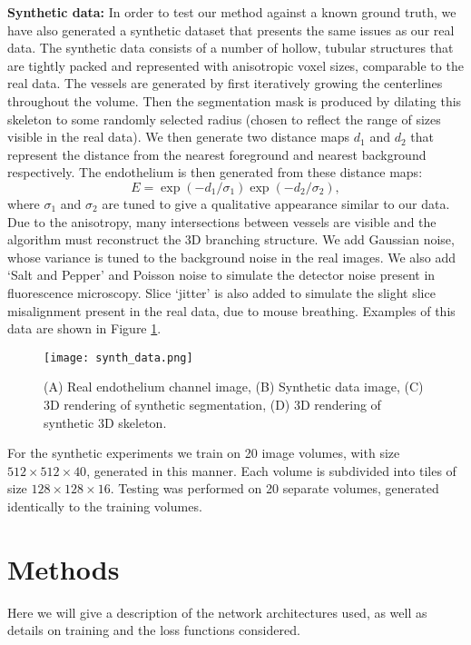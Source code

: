 \documentclass[journal,transmag]{IEEEtran}
\begin{document}
\textbf{Synthetic data:} In order to test our method against a known ground truth, we have also generated a synthetic dataset that presents the same issues as our real data. The synthetic data consists of a number of hollow, tubular structures that are tightly packed and represented with anisotropic voxel sizes, comparable to the real data. The vessels are generated by first iteratively growing the centerlines throughout the volume. Then the segmentation mask is produced by dilating this skeleton to some randomly selected radius (chosen to reflect the range of sizes visible in the real data). We then generate two distance maps $d_1$ and $d_2$ that represent the distance from the nearest foreground and nearest background respectively. The endothelium is then generated from these distance maps:
\[
E = \exp(-d_1 / \sigma_1 ) \exp(-d_2 / \sigma_2),
\]
where $\sigma_1$ and $\sigma_2$ are tuned to give a qualitative appearance similar to our data. 
 Due to the anisotropy, many intersections between vessels are visible and the algorithm must reconstruct the 3D branching structure. We add Gaussian noise, whose variance is tuned to the background noise in the real images. We also add `Salt and Pepper' and Poisson noise to simulate the detector noise present in fluorescence microscopy. Slice `jitter' is also added to simulate the slight slice misalignment present in the real data, due to mouse breathing. Examples of this data are shown in Figure \ref{fig:synthetic_data}.

\begin{figure}
\centering
\texttt{[image: synth\_data.png]}
\caption{(A) Real endothelium channel image, (B) Synthetic data image, (C) 3D rendering of synthetic segmentation, (D) 3D rendering of synthetic 3D skeleton.}
\label{fig:synthetic_data}
\end{figure}

For the synthetic experiments we train on 20 image volumes, with size $512 \times 512 \times 40$, generated in this manner. Each volume is subdivided into tiles of size $128 \times 128 \times 16$. Testing was performed on 20 separate volumes, generated identically to the training volumes. 

\section{Methods}
Here we will give a description of the network architectures used, as well as details on training and the loss functions considered.
\end{document}
